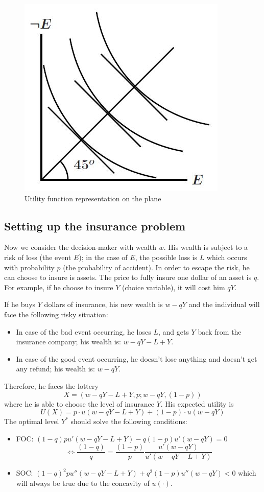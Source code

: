\documentclass[12pt]{report}
\begin{document}
\begin{figure}[ht!]
\centering
\includegraphics[scale=0.55]{images/mrsrisk}
\caption{Utility function representation on the plane}
\end{figure}

\subsection{Setting up the insurance problem}

Now we consider the decision-maker with wealth $w$. His wealth is subject to a risk of loss (the event $E$); in the case of $E$, the possible loss is $L$ which occurs with probability $p$ (the probability of accident). In order to escape the risk, he can choose to insure is assets. The price to fully insure one dollar of an asset is $q$. For example, if he choose to insure $Y$ (choice variable), it will cost him $qY$. 

If he buys $Y$ dollars of insurance, his new wealth is $w - qY$ and the individual will face the following risky situation:\begin{itemize}
\item In case of the bad event occurring, he loses $L$, and gets $Y$ back from the insurance company; his wealth is: $w - qY - L + Y$.
\item In case of the good event occurring, he doesn't lose anything and doesn't get any refund; his wealth is: $w - qY$.
\end{itemize}

Therefore, he faces the lottery $$ X = (w - qY - L + Y, p ; w - qY, (1-p)) $$ where he is able to choose the level of insurance $Y$. His expected utility is $$ U(X) = p\cdot u(w - qY - L + Y) + (1-p)\cdot u(w - qY)$$ The optimal level $Y^*$ should solve the following conditions:\begin{itemize}
\item FOC: $ (1-q)pu'(w - qY - L+Y) - q(1-p)u'(w - qY) = 0 $ $$\Leftrightarrow \frac{(1-q)}{q} = \frac{(1 - p)}{p}\frac{u'(w - qY)}{u'(w - qY - L + Y)} $$
\item SOC: $(1-q)^2pu''(w - qY - L+Y) + q^2(1-p)u''(w - qY) < 0 $ which will always be true due to the concavity of $u(\cdot)$.
\end{itemize}
\end{document}
